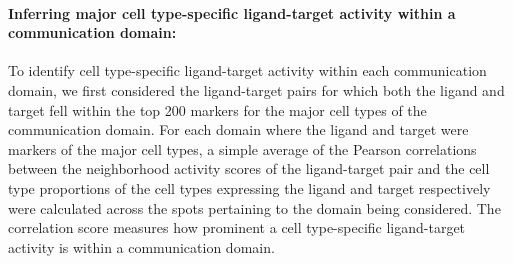 
\paragraph{Inferring major cell type-specific ligand-target activity within a communication domain:} To identify cell type-specific ligand-target activity within each communication domain, we first considered the ligand-target pairs for which both the ligand and target fell within the top 200 markers for the major cell types of the communication domain. For each domain where the ligand and target were markers of the major cell types, a simple average of the Pearson correlations between the neighborhood activity scores of the ligand-target pair and the cell type proportions of the cell types expressing the ligand and target respectively were calculated across the spots pertaining to the domain being considered. The correlation score measures how prominent a cell type-specific ligand-target activity is within a communication domain.


